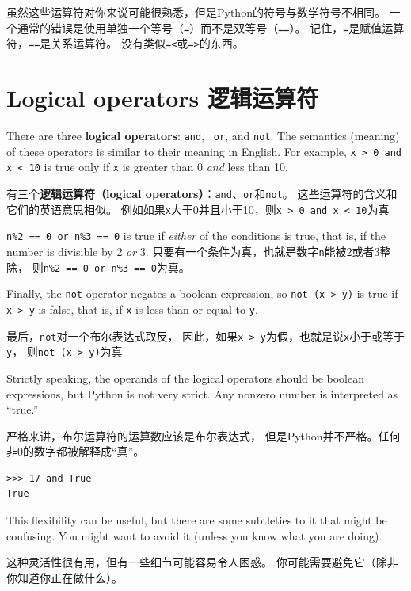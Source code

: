 \documentclass[10pt]{book}
\begin{document}
\begin{CJK}{UTF8}{gbsn}
虽然这些运算符对你来说可能很熟悉，但是Python的符号与数学符号不相同。
一个通常的错误是使用单独一个等号（{\tt =}）而不是双等号（{\tt ==}）。
记住，{\tt =}是赋值运算符，{\tt ==}是关系运算符。
没有类似{\tt =<}或{\tt =>}的东西。

\section {Logical operators 逻辑运算符}

There are three {\bf logical operators}: {\tt and}, {\tt
or}, and {\tt not}.  The semantics (meaning) of these operators is
similar to their meaning in English.  For example,
{\tt x > 0 and x < 10} is true only if {\tt x} is greater than 0
{\em and} less than 10.

有三个{\bf 逻辑运算符（logical operators）}：{\tt and}、{\tt or}和{\tt not}。
这些运算符的含义和它们的英语意思相似。
例如如果{\tt x}大于0并且小于10，则{\tt x > 0 and x < 10}为真

{\tt n\%2 == 0 or n\%3 == 0} is true if {\em either} of the conditions
is true, that is, if the number is divisible by 2 {\em or} 3.
只要有一个条件为真，也就是数字{\tt n}能被2或者3整除，
则{\tt n\%2 == 0 or n\%3 == 0}为真。

Finally, the {\tt not} operator negates a boolean
expression, so {\tt not (x > y)} is true if {\tt x > y} is false,
that is, if {\tt x} is less than or equal to {\tt y}.

最后，{\tt not}对一个布尔表达式取反，
因此，如果{\tt x > y}为假，也就是说{\tt x}小于或等于{\tt y}，
则{\tt not (x > y)}为真

Strictly speaking, the operands of the logical operators should be
boolean expressions, but Python is not very strict.
Any nonzero number is interpreted as ``true.''

严格来讲，布尔运算符的运算数应该是布尔表达式，
但是Python并不严格。任何非0的数字都被解释成``真''。

\begin{verbatim}
>>> 17 and True
True
\end{verbatim}
%
This flexibility can be useful, but there are some subtleties to
it that might be confusing.  You might want to avoid it (unless
you know what you are doing).

这种灵活性很有用，但有一些细节可能容易令人困惑。
你可能需要避免它（除非你知道你正在做什么）。



\end{CJK}
\end{document}
